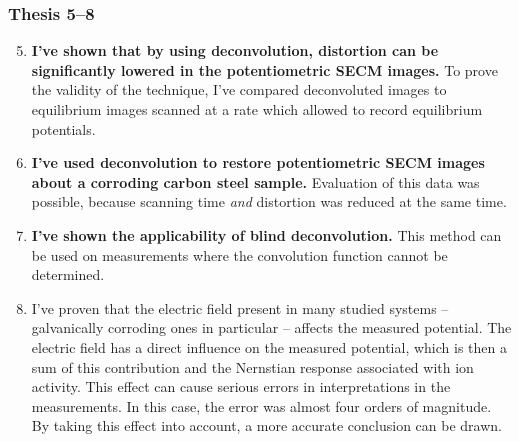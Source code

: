 \documentclass{beamer}
\begin{document}
\begin{frame}
\frametitle{Thesis 5--8}
\scriptsize
\begin{enumerate}
\setcounter{enumi}{4}
\item \textbf{I've shown that by using deconvolution, distortion can be significantly lowered in the potentiometric SECM images.}
To prove the validity of the technique, I've compared deconvoluted images to equilibrium images scanned at a rate which allowed to record equilibrium potentials.

\item \textbf{I've used deconvolution to restore potentiometric SECM images about a corroding carbon steel sample.}
Evaluation of this data was possible, because scanning time \emph{and} distortion was reduced at the same time.

\item \textbf{I've shown the applicability of blind deconvolution.}
This method can be used on measurements where the convolution function cannot be determined.

\item I've proven that the electric field present in many studied systems -- galvanically corroding ones in particular -- affects the measured potential.
The electric field has a direct influence on the measured potential, which is then a sum of this contribution and the Nernstian response associated with ion activity.
This effect can cause serious errors in interpretations in the measurements.
In this case, the error was almost four orders of magnitude.
By taking this effect into account, a more accurate conclusion can be drawn.
\end{enumerate}
\end{frame}
\end{document}
